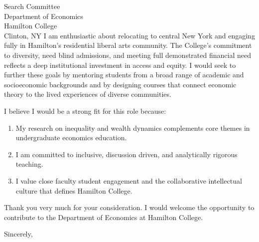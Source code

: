 \documentclass[11pt,letterpaper]{letter}
\begin{document}
\begin{letter}{
Search Committee \\
Department of Economics \\
Hamilton College \\
Clinton, NY
}
I am enthusiastic about relocating to central New York and engaging fully in Hamilton’s residential liberal arts community. The College’s commitment to diversity, need blind admissions, and meeting full demonstrated financial need reflects a deep institutional investment in access and equity. I would seek to further these goals by mentoring students from a broad range of academic and socioeconomic backgrounds and by designing courses that connect economic theory to the lived experiences of diverse communities.

I believe I would be a strong fit for this role because:
\begin{enumerate}
    \item My research on inequality and wealth dynamics complements core themes in undergraduate economics education.
    \item I am committed to inclusive, discussion driven, and analytically rigorous teaching.
    \item I value close faculty student engagement and the collaborative intellectual culture that defines Hamilton College.
\end{enumerate}

Thank you very much for your consideration. I would welcome the opportunity to contribute to the Department of Economics at Hamilton College.

\closing{Sincerely,}

\end{letter}
\end{document}
